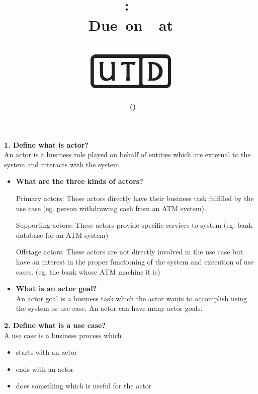 \documentclass[12pt,letterpaper,titlepage,en-US]{article}
\title{
    \vspace{1in}
    \textmd{\textbf{\hmwkClassName \\\hmwkClass:\ \hmwkTitle }}\\
    \normalsize\vspace{0.1in}\small{Due\ on\ \DTMusedate{DueDate}\ at \DTMusetime{DueDate} }\\
    \vspace{0.1in}\large{\textit{\hmwkClassInstructor}}\\
    \vspace{0.5in}\includegraphics[height=2.4em]{UTD_logo_BW}\\
    \vspace{2in}
}
\author{\textbf{\hmwkAuthorName\ \footnotesize{(\hmwkAuthorNetID)}} \\ }
\date{}
\begin{document}
\maketitle





\textbf{1. Define what is actor?}\\
An actor is a business role played on behalf of entities which are external to the system and interacts with the system.


\begin{itemize}[nolistsep,noitemsep]

\item \textbf{What are the three kinds of actors?}

Primary actors: These actors directly have their business task fulfilled by the use case (eg. person withdrawing cash from an ATM system).

Supporting actors: These actors provide specific services to system (eg. bank database for an ATM system)

Offstage actors: These actors are not directly involved in the use case but have an interest in the proper functioning of the system and execution of use cases. (eg. the bank whose ATM machine it is)

\item \textbf{What is an actor goal?}\\
An actor goal is a business task which the actor wants to accomplish using the system or use case. An actor can have many actor goals.\\

\end{itemize}

\textbf{2. Define what is a use case?  }\\
A use case is a business process which
\begin{itemize}[noitemsep,nolistsep]
\item starts with an actor
\item ends with an actor
\item does something which is useful for the actor\\
\end{itemize}
\end{document}
